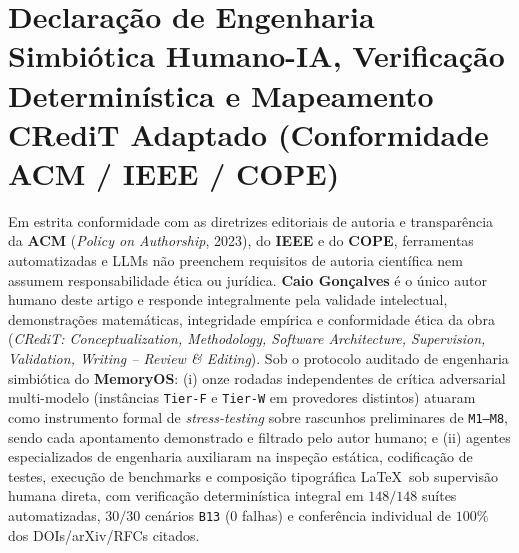 \documentclass[10pt,twocolumn]{article}
\begin{document}
\section*{Declara\c{c}\~ao de Engenharia Simbi\'otica Humano-IA, Verifica\c{c}\~ao Determin\'istica e Mapeamento CRediT Adaptado (Conformidade ACM / IEEE / COPE)}

Em estrita conformidade com as diretrizes editoriais de autoria e transpar\^encia da \textbf{ACM} (\emph{Policy on Authorship}, 2023), do \textbf{IEEE} e do \textbf{COPE}, ferramentas automatizadas e LLMs n\~ao preenchem requisitos de autoria cient\'ifica nem assumem responsabilidade \'etica ou jur\'idica. \textbf{Caio Gon\c{c}alves} \'e o \'unico autor humano deste artigo e responde integralmente pela validade intelectual, demonstra\c{c}\~oes matem\'aticas, integridade emp\'irica e conformidade \'etica da obra (\emph{CRediT: Conceptualization, Methodology, Software Architecture, Supervision, Validation, Writing -- Review \& Editing}). Sob o protocolo auditado de engenharia simbi\'otica do \textbf{MemoryOS}: (i) onze rodadas independentes de cr\'itica adversarial multi-modelo (inst\^ancias \texttt{Tier-F} e \texttt{Tier-W} em provedores distintos) atuaram como instrumento formal de \emph{stress-testing} sobre rascunhos preliminares de \texttt{M1--M8}, sendo cada apontamento demonstrado e filtrado pelo autor humano; e (ii) agentes especializados de engenharia auxiliaram na inspe\c{c}\~ao est\'atica, codifica\c{c}\~ao de testes, execu\c{c}\~ao de benchmarks e composi\c{c}\~ao tipogr\'afica \LaTeX\ sob supervis\~ao humana direta, com verifica\c{c}\~ao determin\'istica integral em $148/148$ su\'ites automatizadas, $30/30$ cen\'arios \texttt{B13} ($0$ falhas) e confer\^encia individual de $100\%$ dos DOIs/arXiv/RFCs citados.



\end{document}
